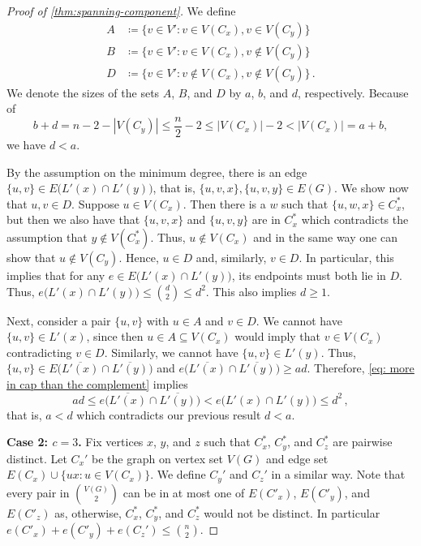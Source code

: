 \documentclass[10pt,a4paper]{amsart}
\newcommand{\abs}[1]{\left\lvert#1\right\rvert}
\newcommand{\subs}{\subseteq}
\begin{document}
\begin{proof}[Proof of \cref{thm:spanning-component}]
		We define
		\begin{align*}A &\coloneqq \big\{v\in V'\colon v\in V(C_x), v\in V(C_y)\big\}\\
			B &\coloneqq \big\{v\in V'\colon v\in V(C_x), v\not\in V(C_y)\big\}\\
			D &\coloneqq \big\{v\in V'\colon v\not\in V(C_x), v\not\in V(C_y)\big\}\,.
		\end{align*}
		We denote the sizes of the sets $A$, $B$, and $D$ by $a$, $b$, and $d$, respectively.
		Because of \[b+d=n-2-\abs{V(C_y)}\le \frac{n}{2}-2\le \abs{V(C_x)}-2<\abs{V(C_x)}=a+b,\]
		we have $d< a$.
		
		By the assumption on the minimum degree, there is an edge $\{u,v\}\in E\big(L'(x)\cap L'(y)\big)$, that is,  $\{u,v,x\},\{u,v,y\}\in E(G)$.
		We show now that $u,v\in D$. Suppose $u\in V(C_x)$. Then there is a $w$ such that $\{u,w,x\}\in C_x^\ast$, but then we also have that $\{u,v,x\}$ and $\{u,v,y\}$ are in $C_x^\ast$ which contradicts the assumption that $y\not\in V(C_x^\ast)$. Thus, $u\not\in V(C_x)$ and in the same way one can show that $u\not\in V(C_y)$. Hence, $u\in D$ and, similarly, $v\in D$. In particular, this implies that for any $e\in E\big(L'(x)\cap L'(y)\big)$, its endpoints must both lie in $D$. Thus, $e\big(L'(x)\cap L'(y)\big)\le \binom{d}{2}\le d^2$. This also implies $d\ge 1$.
		
		Next, consider a pair $\{u,v\}$ with $u\in A$ and $v\in D$. We cannot have $\{u,v\}\in L'(x)$, since then $u\in A\subs V(C_x)$ would imply that $v\in V(C_x)$ contradicting $v\in D$. Similarly, we cannot have $\{u,v\}\in L'(y)$. Thus, $\{u,v\}\in E\big(\overline{L'(x)}\cap\overline{L'(y)}\big)$ and
		$e\big(\overline{L'(x)}\cap\overline{L'(y)}\big)\ge ad$. Therefore, \eqref{eq: more in cap than the complement} implies
		\[ad\le e\big(\overline{L'(x)}\cap\overline{L'(y)}\big)<e\big(L'(x)\cap L'(y)\big)\le d^2\,,\]
		that is, $a<d$ which contradicts our previous result $d< a$.
		
		\medskip
		\textbf{Case 2: $c=3$.}
		Fix vertices $x$, $y$, and $z$ such that $C_x^\ast$, $C_y^\ast$, and $C_z^\ast$ are pairwise distinct. Let $C_x'$ be the graph on vertex set $V(G)$ and edge set $E(C_x)\cup\{ux\colon u\in V(C_x)\}$. We define $C_y'$ and $C_z'$ in a similar way. Note that every pair in $\binom{V(G)}{2}$ can be in at most one of $E(C'_x)$, $E(C'_y)$, and $E(C'_z)$ as, otherwise, $C_x^\ast$, $C_y^\ast$, and $C_z^\ast$ would not be distinct. In particular $e(C'_x)+e(C'_y)+e(C_z')\le \binom{n}{2}$.
		

\end{proof}
\end{document}
